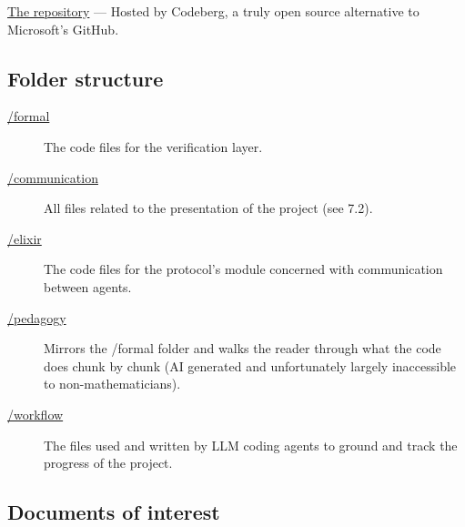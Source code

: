 \documentclass[11pt]{article}
\begin{document}
\href{https://codeberg.org/doc2cog/hoapa}{The repository} --- Hosted by Codeberg, a truly open source alternative to Microsoft's GitHub.

\subsection{Folder structure}

\begin{description}

\item[\href{https://codeberg.org/doc2cog/hoapa/src/branch/main/formal}{/formal}]
The code files for the verification layer.

\item[\href{https://codeberg.org/doc2cog/hoapa/src/branch/main/communication}{/communication}]
All files related to the presentation of the project (see 7.2).

\item[\href{https://codeberg.org/doc2cog/hoapa/src/branch/main/elixir}{/elixir}]
The code files for the protocol's module concerned with communication between agents.

\item[\href{https://codeberg.org/doc2cog/hoapa/src/branch/main/pedagogy}{/pedagogy}]
Mirrors the /formal folder and walks the reader through what the code does chunk by chunk (AI generated and unfortunately largely inaccessible to non-mathematicians).

\item[\href{https://codeberg.org/doc2cog/hoapa/src/branch/main/workflow}{/workflow}]
The files used and written by LLM coding agents to ground and track the progress of the project.

\end{description}

\subsection{Documents of interest}
\end{document}
